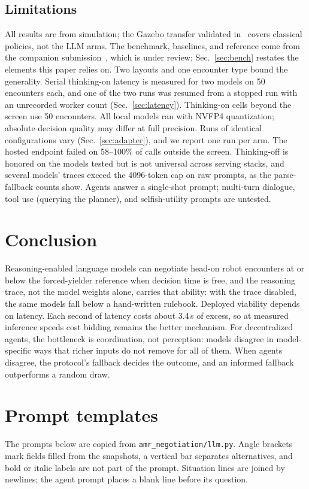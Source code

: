 \documentclass[journal]{IEEEtran}
\begin{document}
\subsection{Limitations}
All results are from simulation; the Gazebo transfer validated in~\cite{paper1} covers classical policies, not the LLM arms. The benchmark, baselines, and reference come from the companion submission~\cite{paper1}, which is under review; Sec.~\ref{sec:bench} restates the elements this paper relies on. Two layouts and one encounter type bound the generality. Serial thinking-on latency is measured for two models on 50 encounters each, and one of the two runs was resumed from a stopped run with an unrecorded worker count (Sec.~\ref{sec:latency}). Thinking-on cells beyond the screen use 50 encounters. All local models ran with NVFP4 quantization; absolute decision quality may differ at full precision. Runs of identical configurations vary (Sec.~\ref{sec:adapter}), and we report one run per arm. The hosted endpoint failed on 58--100\% of calls outside the screen. Thinking-off is honored on the models tested but is not universal across serving stacks, and several models' traces exceed the 4096-token cap on raw prompts, as the parse-fallback counts show. Agents answer a single-shot prompt; multi-turn dialogue, tool use (querying the planner), and selfish-utility prompts are untested.

\section{Conclusion}
Reasoning-enabled language models can negotiate head-on robot encounters at or below the forced-yielder reference when decision time is free, and the reasoning trace, not the model weights alone, carries that ability: with the trace disabled, the same models fall below a hand-written rulebook. Deployed viability depends on latency. Each second of latency costs about 3.4\,s of excess, so at measured inference speeds cost bidding remains the better mechanism. For decentralized agents, the bottleneck is coordination, not perception: models disagree in model-specific ways that richer inputs do not remove for all of them. When agents disagree, the protocol's fallback decides the outcome, and an informed fallback outperforms a random draw.

\appendices
\section{Prompt templates}
\label{app:prompts}
The prompts below are copied from \texttt{amr\_negotiation/llm.py}. Angle brackets mark fields filled from the snapshots, a vertical bar separates alternatives, and bold or italic labels are not part of the prompt. Situation lines are joined by newlines; the agent prompt places a blank line before its question.
\end{document}
